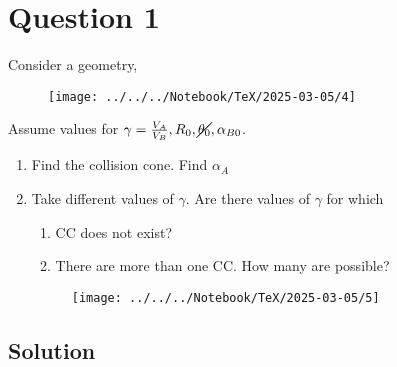 \section*{Question 1}

Consider a geometry,
\vspace*{-1.5em}
\begin{figure}[htbp]
      \centering
      \texttt{[image: ../../../Notebook/TeX/2025-03-05/4]}
\end{figure}
\vspace*{-1.5em}
Assume values for \( \gamma = \frac{V_A}{V_B}, R_0, \cancel{\theta_0}, \alpha_{B0} \).
\begin{enumerate}[label= (\alph*), noitemsep, topsep=0pt]
      \item Find the collision cone.
            Find \( \alpha_A \)
      \item Take different values of \( \gamma \).
            Are there values of \( \gamma \) for which
            \begin{enumerate}[label= (\alph*), noitemsep, topsep=0pt]
                  \item CC does not exist?
                  \item There are more than one CC.
                        How many are possible?
            \end{enumerate}
            \vspace*{-1.5em}
            \begin{figure}[htbp]
                  \centering
                  \texttt{[image: ../../../Notebook/TeX/2025-03-05/5]}
            \end{figure}
\end{enumerate}

\vspace*{-3em}
\subsection*{Solution}
